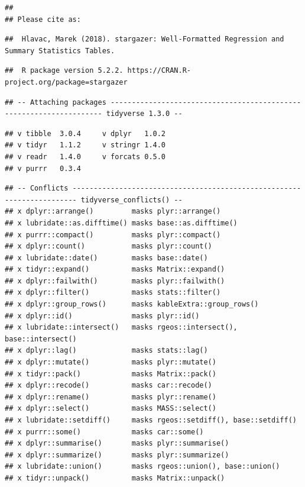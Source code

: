 \documentclass[
]{book}
\begin{document}
\begin{verbatim}
## 
## Please cite as:
\end{verbatim}

\begin{verbatim}
##  Hlavac, Marek (2018). stargazer: Well-Formatted Regression and Summary Statistics Tables.
\end{verbatim}

\begin{verbatim}
##  R package version 5.2.2. https://CRAN.R-project.org/package=stargazer
\end{verbatim}

\begin{verbatim}
## -- Attaching packages -------------------------------------------------------------------- tidyverse 1.3.0 --
\end{verbatim}

\begin{verbatim}
## v tibble  3.0.4     v dplyr   1.0.2
## v tidyr   1.1.2     v stringr 1.4.0
## v readr   1.4.0     v forcats 0.5.0
## v purrr   0.3.4
\end{verbatim}

\begin{verbatim}
## -- Conflicts ----------------------------------------------------------------------- tidyverse_conflicts() --
## x dplyr::arrange()         masks plyr::arrange()
## x lubridate::as.difftime() masks base::as.difftime()
## x purrr::compact()         masks plyr::compact()
## x dplyr::count()           masks plyr::count()
## x lubridate::date()        masks base::date()
## x tidyr::expand()          masks Matrix::expand()
## x dplyr::failwith()        masks plyr::failwith()
## x dplyr::filter()          masks stats::filter()
## x dplyr::group_rows()      masks kableExtra::group_rows()
## x dplyr::id()              masks plyr::id()
## x lubridate::intersect()   masks rgeos::intersect(), base::intersect()
## x dplyr::lag()             masks stats::lag()
## x dplyr::mutate()          masks plyr::mutate()
## x tidyr::pack()            masks Matrix::pack()
## x dplyr::recode()          masks car::recode()
## x dplyr::rename()          masks plyr::rename()
## x dplyr::select()          masks MASS::select()
## x lubridate::setdiff()     masks rgeos::setdiff(), base::setdiff()
## x purrr::some()            masks car::some()
## x dplyr::summarise()       masks plyr::summarise()
## x dplyr::summarize()       masks plyr::summarize()
## x lubridate::union()       masks rgeos::union(), base::union()
## x tidyr::unpack()          masks Matrix::unpack()
\end{verbatim}
\end{document}

